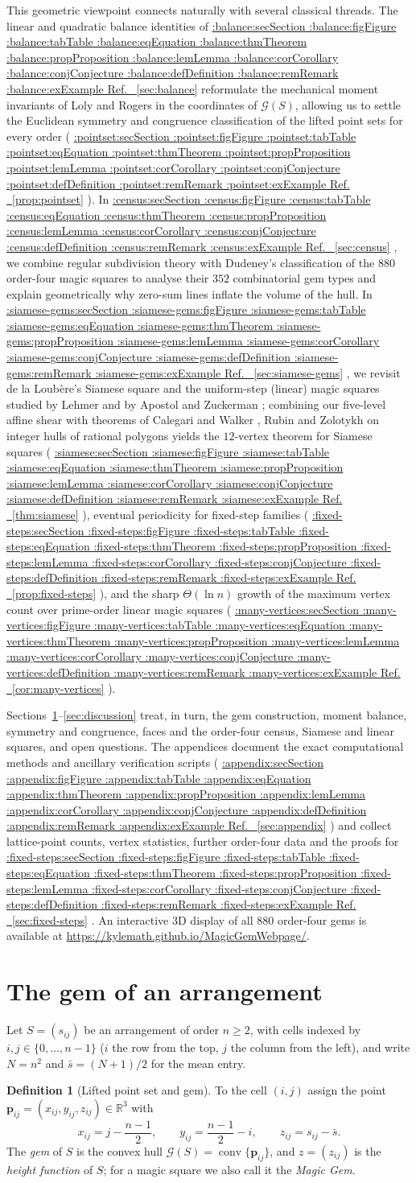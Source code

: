 \documentclass[11pt,a4paper]{article}
\makeatletter
\def\Cref@getprefix#1:#2\relax{#1}
\def\Cref@prefix@sec{sec}
\def\Cref@prefix@fig{fig}
\def\Cref@prefix@tab{tab}
\def\Cref@prefix@eq{eq}
\def\Cref@prefix@thm{thm}
\def\Cref@prefix@prop{prop}
\def\Cref@prefix@lem{lem}
\def\Cref@prefix@cor{cor}
\def\Cref@prefix@conj{conj}
\def\Cref@prefix@def{def}
\def\Cref@prefix@rem{rem}
\def\Cref@prefix@ex{ex}
\def\Cref@type@cap#1{%
  \edef\Cref@tmp{#1}%
  \ifx\Cref@tmp\Cref@prefix@sec Section%
  \else\ifx\Cref@tmp\Cref@prefix@fig Figure%
  \else\ifx\Cref@tmp\Cref@prefix@tab Table%
  \else\ifx\Cref@tmp\Cref@prefix@eq Equation%
  \else\ifx\Cref@tmp\Cref@prefix@thm Theorem%
  \else\ifx\Cref@tmp\Cref@prefix@prop Proposition%
  \else\ifx\Cref@tmp\Cref@prefix@lem Lemma%
  \else\ifx\Cref@tmp\Cref@prefix@cor Corollary%
  \else\ifx\Cref@tmp\Cref@prefix@conj Conjecture%
  \else\ifx\Cref@tmp\Cref@prefix@def Definition%
  \else\ifx\Cref@tmp\Cref@prefix@rem Remark%
  \else\ifx\Cref@tmp\Cref@prefix@ex Example%
  \else Ref.%
  \fi\fi\fi\fi\fi\fi\fi\fi\fi\fi\fi\fi
}
\DeclareRobustCommand{\Cref}[1]{%
  \begingroup
  \edef\Cref@label{#1}%
  \edef\Cref@prefix{\expandafter\Cref@getprefix\Cref@label:\relax}%
  \hyperref[#1]{\Cref@type@cap{\Cref@prefix}~\ref*{#1}}%
  \endgroup
}
\theoremstyle{plain}
\theoremstyle{definition}
\newtheorem{definition}[theorem]{Definition}
\theoremstyle{remark}
\newcommand{\R}{\mathbb{R}}
\makeatother
\begin{document}
This geometric viewpoint connects naturally with several classical threads. The linear and quadratic balance identities of \Cref{sec:balance} reformulate the mechanical moment invariants of Loly and Rogers \cite{loly2004invariance,rogers2004inertia,rogers2005multipole} in the coordinates of $\mathcal G(S)$, allowing us to settle the Euclidean symmetry and congruence classification of the lifted point sets for every order (\Cref{prop:pointset}). In \Cref{sec:census}, we combine regular subdivision theory with Dudeney's classification of the $880$ order-four magic squares \cite{dudeney1917amusements} to analyse their $352$ combinatorial gem types and explain geometrically why zero-sum lines inflate the volume of the hull. In \Cref{sec:siamese-gems}, we revisit de la Loub\`ere's Siamese square \cite{loubere1693} and the uniform-step (linear) magic squares studied by Lehmer \cite{lehmer1929} and by Apostol and Zuckerman \cite{apostol1951}; combining our five-level affine shear with theorems of Calegari and Walker \cite{calegari2013integer}, Rubin \cite{rubin1970} and Zolotykh \cite{zolotykh2006vertices} on integer hulls of rational polygons yields the $12$-vertex theorem for Siamese squares (\Cref{thm:siamese}), eventual periodicity for fixed-step families (\Cref{prop:fixed-steps}), and the sharp $\Theta(\ln n)$ growth of the maximum vertex count over prime-order linear magic squares (\Cref{cor:many-vertices}).

Sections~\ref{sec:gem}--\ref{sec:discussion} treat, in turn, the gem construction, moment balance, symmetry and congruence, faces and the order-four census, Siamese and linear squares, and open questions. The appendices document the exact computational methods and ancillary verification scripts (\Cref{sec:appendix}) and collect lattice-point counts, vertex statistics, further order-four data and the proofs for \Cref{sec:fixed-steps}.
An interactive 3D display of all $880$ order-four gems is available at \url{https://kylemath.github.io/MagicGemWebpage/}.

\section{The gem of an arrangement}
\label{sec:gem}

Let $S=(s_{ij})$ be an arrangement of order $n\ge2$, with cells indexed by $i,j\in\{0,\dots,n-1\}$ ($i$ the row from the top, $j$ the column from the left), and write $N=n^2$ and $\bar s=(N+1)/2$ for the mean entry.

\begin{definition}[Lifted point set and gem]
\label{def:gem_coords}
To the cell $(i,j)$ assign the point $\mathbf p_{ij}=(x_{ij},y_{ij},z_{ij})\in\R^3$ with
\begin{equation}
x_{ij}=j-\frac{n-1}{2},\qquad y_{ij}=\frac{n-1}{2}-i,\qquad z_{ij}=s_{ij}-\bar s.
\label{eq:gem_coords}
\end{equation}
The \emph{gem} of $S$ is the convex hull $\mathcal G(S)=\operatorname{conv}\{\mathbf p_{ij}\}$, and $z=(z_{ij})$ is the \emph{height function} of $S$; for a magic square we also call it the \emph{Magic Gem}.
\end{definition}
\end{document}
